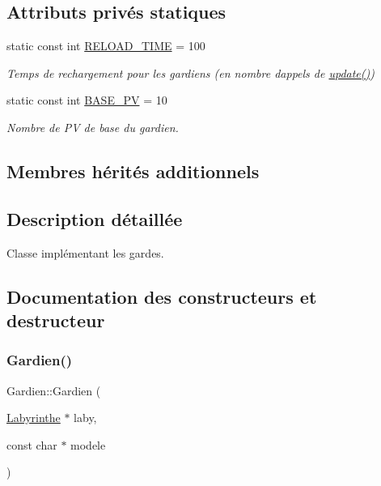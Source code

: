 \subsection*{Attributs privés statiques}
\begin{DoxyCompactItemize}
\item 
static const int \hyperlink{classGardien_a9848c409574b185b566caa7b9c900ae7}{R\+E\+L\+O\+A\+D\+\_\+\+T\+I\+ME} = 100
\begin{DoxyCompactList}\small\item\em Temps de rechargement pour les gardiens (en nombre d\textquotesingle{}appels de \hyperlink{classGardien_aed498f0d6bbb526e0373a914ba6bf9aa}{update()}) \end{DoxyCompactList}\item 
static const int \hyperlink{classGardien_a1832c02b32c6e47b240536fd6ba47812}{B\+A\+S\+E\+\_\+\+PV} = 10
\begin{DoxyCompactList}\small\item\em Nombre de PV de base du gardien. \end{DoxyCompactList}\end{DoxyCompactItemize}
\subsection*{Membres hérités additionnels}


\subsection{Description détaillée}
Classe implémentant les gardes. 

\subsection{Documentation des constructeurs et destructeur}
\mbox{\label{classGardien_afc1e450fa7ad919d801475b34ced6e8d}} 
\subsubsection{\texorpdfstring{Gardien()}{Gardien()}}
{\footnotesize\ttfamily Gardien\+::\+Gardien (\begin{DoxyParamCaption}\item[{\hyperlink{classLabyrinthe}{Labyrinthe} $\ast$}]{laby,  }\item[{const char $\ast$}]{modele }\end{DoxyParamCaption})\hspace{0.3cm}{\ttfamily [inline]}}

